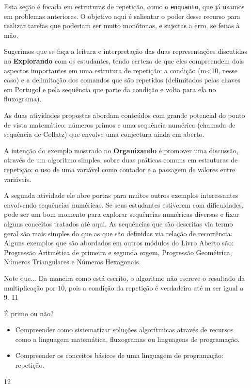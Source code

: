 \cleardoublepage
\def\currentcolor{session1}
\begin{texto}
{
Esta seção é focada em estruturas de repetição, como o \texttt{enquanto}, que já usamos em problemas anteriores. O objetivo aqui é salientar o poder desse recurso para realizar tarefas que poderiam ser muito monótonas, e sujeitas a erro, se feitas à mão.

Sugerimos que se faça a leitura e interpretação das duas representações discutidas no \textbf{Explorando} com os estudantes, tendo certeza de que eles compreendem dois aspectos importantes em uma estrutura de repetição: a condição (m<10, nesse caso) e a delimitação dos comandos que são repetidos (delimitados pelas chaves em Portugol e pela sequência que parte da condição e volta para ela no fluxograma).

As duas atividades propostas abordam conteúdos com grande potencial do ponto de vista matemático: números primos e uma sequência numérica (chamada de sequência de Collatz) que envolve uma conjectura ainda em aberto.

A intenção do exemplo mostrado no \textbf{Organizando} é promover uma discussão, através de um algoritmo simples, sobre duas práticas comuns em estruturas de repetição: o uso de uma variável como contador e a passagem de valores entre variáveis.

A segunda atividade ele abre portas para muitos outros exemplos interessantes envolvendo sequências numéricas. Se seus estudantes estiverem com dificuldades, pode ser um bom momento para explorar sequências numéricas diversas e fixar alguns conceitos tratados até aqui. As sequências que são descritas via termo geral são mais simples do que as que são definidas via relação de recorrência. Alguns exemplos que são abordados em outros módulos do Livro Aberto são: Progressão Aritmética de primeira e segunda orgem, Progressão Geométrica, Números Triangulares e Números Hexagonais.
}
\end{texto}

\begin{sugestions}{Note que...}
{
Da maneira como está escrito, o algoritmo não escreve o resultado da multiplicação por $10$, pois a condição da repetição é verdadeira até m ser igual a $9$.
}{1}{1}
\end{sugestions}

\clearmargin

\begin{objectives}{É primo ou não?}
{
\begin{itemize}
\item Compreender como sistematizar soluções algorítmicas através de recursos como a linguagem matemática, fluxogramas ou linguagens de programação.

\item Compreender os conceitos básicos de uma linguagem de programação: repetição.
\end{itemize}
}{1}{2}
\end{objectives}

